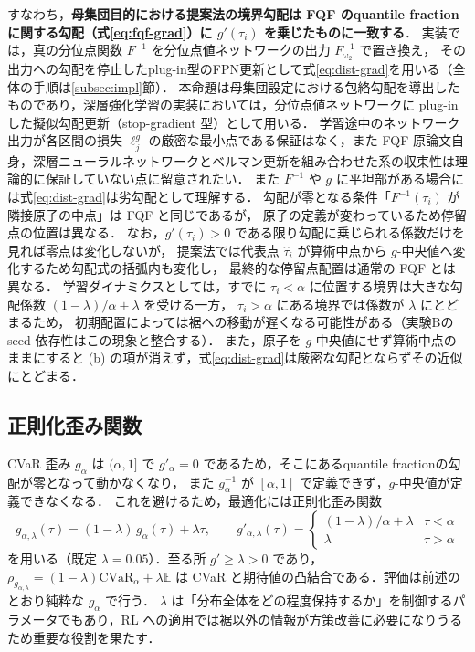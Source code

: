 \documentclass[a4paper,10pt]{jsarticle}
\theoremstyle{definition}
\newcommand{\CVaR}{\mathrm{CVaR}}
\newcommand{\Finv}{F^{-1}}
\newcommand{\E}{\mathbb{E}}
\begin{document}
すなわち，\textbf{母集団目的における提案法の境界勾配は FQF のquantile fractionに関する勾配（式\eqref{eq:fqf-grad}）に $g'(\tau_i)$ を乗じたものに一致する}．
実装では，真の分位点関数 $\Finv$ を分位点値ネットワークの出力 $\Finv_{\omega_2}$ で置き換え，
その出力への勾配を停止したplug-in型のFPN更新として式\eqref{eq:dist-grad}を用いる（全体の手順は\ref{subsec:impl}節）．
本命題は母集団設定における包絡勾配を導出したものであり，深層強化学習の実装においては，分位点値ネットワークに plug-in した擬似勾配更新（stop-gradient 型）として用いる．
学習途中のネットワーク出力が各区間の損失 $\ell_j^g$ の厳密な最小点である保証はなく，また FQF 原論文自身，深層ニューラルネットワークとベルマン更新を組み合わせた系の収束性は理論的に保証していない点に留意されたい．
また $\Finv$ や $g$ に平坦部がある場合には式\eqref{eq:dist-grad}は劣勾配として理解する．
勾配が零となる条件「$\Finv(\tau_i)$ が隣接原子の中点」は FQF と同じであるが，
原子の定義が変わっているため停留点の位置は異なる．
なお，$g'(\tau_i)>0$ である限り勾配に乗じられる係数だけを見れば零点は変化しないが，
提案法では代表点 $\hat\tau_i$ が算術中点から $g$-中央値へ変化するため勾配式の括弧内も変化し，
最終的な停留点配置は通常の FQF とは異なる．
学習ダイナミクスとしては，すでに $\tau_i<\alpha$ に位置する境界は大きな勾配係数 $(1-\lambda)/\alpha+\lambda$ を受ける一方，
$\tau_i>\alpha$ にある境界では係数が $\lambda$ にとどまるため，
初期配置によっては裾への移動が遅くなる可能性がある（実験Bの seed 依存性はこの現象と整合する）．
また，原子を $g$-中央値にせず算術中点のままにすると (b) の項が消えず，式\eqref{eq:dist-grad}は厳密な勾配とならずその近似にとどまる．

\subsection{正則化歪み関数}
CVaR 歪み $g_\alpha$ は $(\alpha,1]$ で $g'_\alpha=0$ であるため，そこにあるquantile fractionの勾配が零となって動かなくなり，
また $g_\alpha^{-1}$ が $[\alpha,1]$ で定義できず，$g$-中央値が定義できなくなる．
これを避けるため，最適化には正則化歪み関数
\begin{equation}
  g_{\alpha,\lambda}(\tau)=(1-\lambda)\,g_\alpha(\tau)+\lambda\tau,\qquad
  g'_{\alpha,\lambda}(\tau)=\begin{cases}(1-\lambda)/\alpha+\lambda & \tau<\alpha\\ \lambda & \tau>\alpha\end{cases}
  \label{eq:g-reg}
\end{equation}
を用いる（既定 $\lambda=0.05$）．至る所 $g'\ge\lambda>0$ であり，$\rho_{g_{\alpha,\lambda}}=(1-\lambda)\CVaR_\alpha+\lambda\E$ は
CVaR と期待値の凸結合である．評価は前述のとおり純粋な $g_\alpha$ で行う．
$\lambda$ は「分布全体をどの程度保持するか」を制御するパラメータでもあり，RL への適用では裾以外の情報が方策改善に必要になりうるため重要な役割を果たす．
\end{document}
